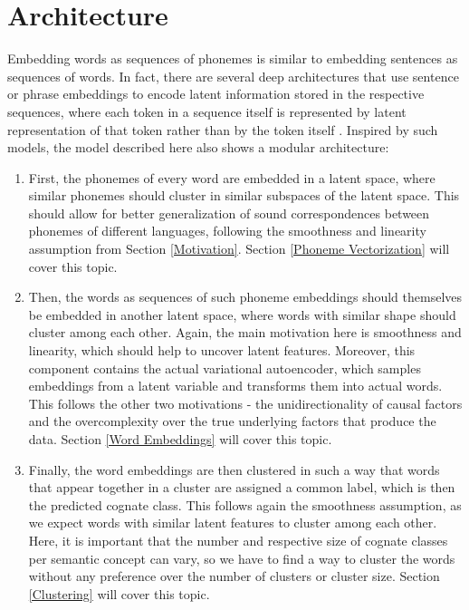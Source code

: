 \documentclass[6pt]{article}
\begin{document}
\section{Architecture}
Embedding words as sequences of phonemes is similar to embedding sentences as sequences of words. In fact, there are several deep architectures that use sentence or phrase embeddings to encode latent information stored in the respective sequences, where each token in a sequence itself is represented by latent representation of that token rather than by the token itself \citep{kiros2015skip,zhang2014bilingually}.
Inspired by such models, the model described here also shows a modular architecture:
\begin{enumerate}
\item First, the phonemes of every word are embedded in a latent space, where similar phonemes should cluster in similar subspaces of the latent space. This should allow for better generalization of sound correspondences between phonemes of different languages, following the smoothness and linearity assumption from Section \ref{Motivation}. Section \ref{Phoneme Vectorization} will cover this topic.
\item Then, the words as sequences of such phoneme embeddings should themselves be embedded in another latent space, where words with similar shape should cluster among each other.  Again, the main motivation here is smoothness and linearity, which should help to uncover latent features. Moreover, this component contains the actual variational autoencoder, which samples embeddings from a latent variable and transforms them into actual words. This follows the other two motivations - the unidirectionality of causal factors and the overcomplexity over the true underlying factors that produce the data. Section \ref{Word Embeddings} will cover this topic.
\item Finally, the word embeddings are then clustered in such a way that words that appear together in a cluster are assigned a common label, which is then the predicted cognate class.  This follows again the smoothness assumption, as we expect words with similar latent features to cluster among each other. Here, it is important that the number and respective size of cognate classes per semantic concept can vary, so we have to find a way to cluster the words without any preference over the number of clusters or cluster size. Section \ref{Clustering} will cover this topic.
\end{enumerate}
\end{document}
